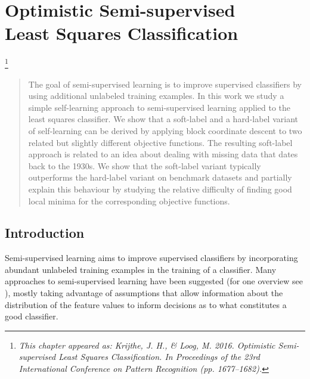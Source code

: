 \documentclass[twoside]{memoir}\usepackage[]{graphicx}\usepackage{xcolor}
\newcommand\blfootnote[1]{%
  \begingroup
  \renewcommand\thefootnote{}\footnote{\itshape#1}%
  \addtocounter{footnote}{-1}%
  \endgroup
}
\begin{document}

%


\chapter[Optimistic Semi-supervised Least Squares Classification]{Optimistic Semi-supervised\\Least Squares Classification}
\label{chapter:optimistic}
\blfootnote{This chapter appeared as: Krijthe, J. H., \& Loog, M. 2016. Optimistic Semi-supervised Least Squares Classification. In Proceedings of the 23rd International Conference on Pattern Recognition (pp. 1677–1682).}


\begin{abstract}
The goal of semi-supervised learning is to improve supervised classifiers by using additional unlabeled training examples. In this work we study a simple self-learning approach to semi-supervised learning applied to the least squares classifier. We show that a soft-label and a hard-label variant of self-learning can be derived by applying block coordinate descent to two related but slightly different objective functions. The resulting soft-label approach is related to an idea about dealing with missing data that dates back to the 1930s. We show that the soft-label variant typically outperforms the hard-label variant on benchmark datasets and partially explain this behaviour by studying the relative difficulty of finding good local minima for the corresponding objective functions.
\end{abstract}

\section{Introduction}
Semi-supervised learning aims to improve supervised classifiers by incorporating abundant unlabeled training examples in the training of a classifier. Many approaches to semi-supervised learning have been suggested (for one overview see \citet{Chapelle2006}), mostly taking advantage of assumptions that allow information about the distribution of the feature values to inform decisions as to what constitutes a good classifier.
\end{document}
